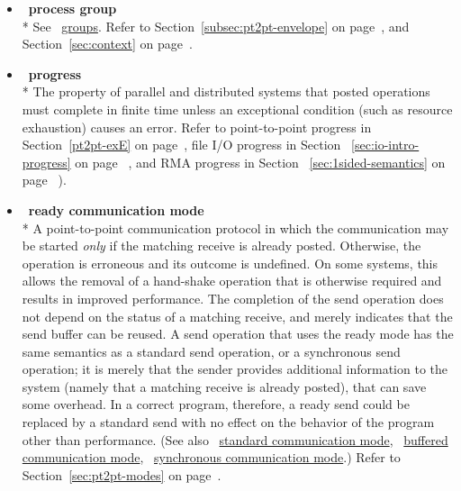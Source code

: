 \begin{itemize}
\label{glossary:process_group}
\item  ~\hypertarget{glossary:process_group}{\textbf{process group}} \\*
See ~\hyperlink{glossary:groups}{groups}.
Refer to Section~\ref{subsec:pt2pt-envelope} on page~\pageref{subsec:pt2pt-envelope}, and
Section~\ref{sec:context} on page~\pageref{sec:context}.

\label{glossary:progress}
\item  ~\hypertarget{glossary:progress}{\textbf{progress}} \\*
The property of parallel and distributed systems that
posted operations must complete in finite time
unless an exceptional condition (such as resource exhaustion)
causes an error.
Refer to point-to-point progress in Section~\ref{pt2pt-exE} on page~\pageref{pt2pt-exE},
file I/O progress in Section ~\ref{sec:io-intro-progress} on page ~\pageref{sec:io-intro-progress},
and RMA progress in Section ~\ref{sec:1sided-semantics} on page ~\pageref{sec:1sided-semantics}).

\label{glossary:ready_communication_mode}
\item  ~\hypertarget{glossary:ready_communication_mode}{\textbf{ready communication mode}} \\*
A point-to-point communication protocol in which the communication
may be started {\em only} if the matching receive is already posted.
Otherwise, the operation is erroneous and its outcome is undefined.
On some systems, this allows the removal of a hand-shake
operation that is otherwise required and results in improved
performance.
The completion of the send operation does not depend on the
status of a matching receive, and merely indicates that the send
buffer can be reused.   A send operation that uses the ready mode has
the same semantics as a standard send operation, or a synchronous send
operation; it is merely that the sender provides additional
information to the system (namely that a matching receive is already
posted), that can save some overhead.  In a correct program, therefore, a
ready send could be replaced by a standard send with no effect on the
behavior of the program other than performance.
(See also ~\hyperlink{glossary:standard_communication_mode}{standard communication mode}, 
~\hyperlink{glossary:buffered_communication_mode}{buffered communication mode},
~\hyperlink{glossary:synchronous_communication_mode}{synchronous communication mode}.)
Refer to Section~\ref{sec:pt2pt-modes} on page~\pageref{sec:pt2pt-modes}.


\end{itemize}

